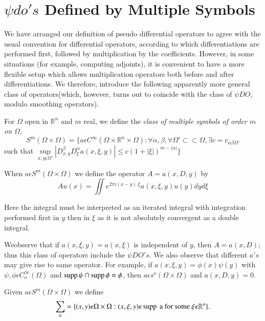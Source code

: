 \section{$\psi do's$ Defined by Multiple Symbols}\label{chap4:sec5} %

We have arranged our definition of pseudo differential operators to
agree with the usual convention for differential operators, according
to which differentiations are performed first, followed by
multiplication by the coefficients. However, in some situations (for
example, computing adjoints), it is convenient to have a more flexible
setup which allows multiplication operators both before and after
differentiations. We therefore, introduce the following apparently
more general class of operators\break  (which, however, turns out to coincide
with the class of $\psi DO$, modulo smoothing operators). 

\setcounter{defi}{24}
\begin{defi}\label{chap4:sec5:def4.25}%
  For $ \Omega $ open in $\mathbb{R}^n$ and $m$ real, we define the {
    \em class of multiple symbols of order $m$ on $\Omega $,} 
  $$
  S^m(\Omega \times \Omega)= \{ a \epsilon C^ \infty (\Omega \times
  \mathbb{R}^n \times \Omega):\forall \alpha, \beta, \forall
  \Omega' \subset \subset \Omega, \exists c=c_{\alpha \beta \Omega '}  
  $$
  such that $\sup\limits_{x,y \epsilon  \Omega'} |D^{\beta}_{x,y} D^
  \alpha _\xi a (x, \xi, y)|\leq  c(1+|\xi|)^{m-|\alpha|} \}$ 
\end{defi}

When $a \epsilon S^m (\Omega \times \Omega)$ we define the operator
$A =a(x,D,y)$ by  
$$
Au (x)= \iint e^{2 \pi i (x-y).\xi}a (x,\xi,y)u(y)dy d \xi
$$

Here the integral must be interpreted as an iterated integral with
integration performed first in $y$ then in $\xi$ as it is not
absolutely convergent as a double integral. 

We\pageoriginale observe that if $a(x, \xi,y)=a (x, \xi)$ is independent of $y$,
then $A=a(x,D)$; thus this class of operators include the $\psi
DO's$. We also observe that different $a's$ may give rise to same
operator. For example, if $a(x,\xi,y)=\phi (x)\psi (y)$ with
$\psi,\phi \epsilon C^\infty_o (\Omega)$ and $\operatorname{supp} \psi \cap \operatorname{supp}\phi
=\phi$, then $a \epsilon s^o(\Omega \times \Omega)$ and
$a(x,D,y)=0$. 

\setcounter{defi}{25}
\begin{defi}%
  Given $a \epsilon S^m (\Omega \times \Omega)$ we define
  $$
  \sum_a=\{ (x,y) \epsilon \Omega \times \Omega :(x, \xi,y) 
  \epsilon \operatorname{supp}  \text{ a for some } \xi \epsilon \mathbb{R}^n
  \}. 
  $$
\end{defi}


